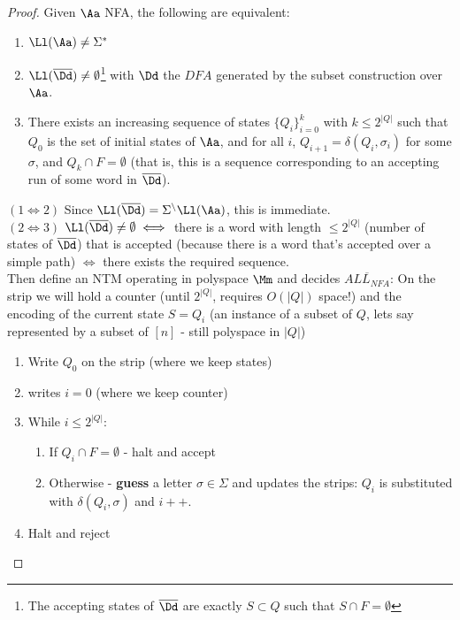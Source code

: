\begin{proof}
	Given $\Aa$ NFA, the following are equivalent:
	\begin{enumerate}
		\item $\Ll(\Aa)\neq \Sigma^*$
		\item $\Ll(\overline{\Dd}) \neq \emptyset$\footnote{The accepting states of $\overline{\Dd}$ are exactly $S\subset Q$ such that $S\cap F = \emptyset$} with $\Dd$ the $DFA$ generated by the subset construction over $\Aa$.
		\item There exists an increasing sequence of states $\{Q_i\}_{i=0}^k$ with $k\leq 2^{|Q|}$ such that $Q_0$ is the set of initial states of $\Aa$, and for all $i$, $Q_{i+1} = \delta(Q_i, \sigma_i)$ for some $\sigma$, and $Q_k\cap F = \emptyset$ (that is, this is a sequence corresponding to an accepting run of some word in $\overline{\Dd}$).
	\end{enumerate}
	$(1\iff 2)$ Since $\Ll(\overline{\Dd}) = \Sigma^\setminus \Ll(\Aa)$, this is immediate.\\
	$(2\iff 3)$ $\Ll(\overline{\Dd})\neq \emptyset \iff$ there is a word with length $\leq 2^{|Q|}$ (number of states of $\overline{\Dd}$) that is accepted (because there is a word that's accepted over a simple path) $\iff$ there exists the required sequence.\\
	
	Then define an NTM operating in polyspace $\Mm$ and decides $\overline{ALL_{NFA}}$: On the strip we will hold a counter (until $2^{|Q|}$, requires $O(|Q|)$ space!) and the encoding of the current state $S = Q_{i}$ (an instance of a subset of $Q$, lets say represented by a subset of $[n]$ - still polyspace in $|Q|$)
	\begin{enumerate}
		\item Write $Q_0$ on the strip (where we keep states)
		\item writes $i=0$ (where we keep counter)
		\item While $i\leq 2^{|Q|}$:
		\begin{enumerate}[3.1]
			\item If $Q_i \cap F = \emptyset$ - halt and accept
			\item Otherwise - \textbf{guess} a letter $\sigma\in \Sigma$ and updates the strips: $Q_i$ is substituted with $\delta(Q_i, \sigma)$ and $i++$.
		\end{enumerate}
	\item Halt and reject
	\end{enumerate}
\end{proof}
